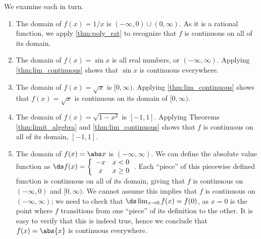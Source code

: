 {We examine each in turn.
\begin{enumerate}
	\item	The domain of $f(x) = 1/x$ is $(-\infty,0) \cup (0,\infty)$. As it is a rational function, we apply \autoref{thm:poly_rat} to recognize that $f$ is continuous on all of its domain.
	\item	The domain of $f(x) = \sin x$ is all real numbers, or $(-\infty,\infty)$. Applying \autoref{thm:lim_continuous} shows that $\sin x$ is continuous everywhere.
	\item	The domain of $f(x) = \sqrt{x}$ is $[0,\infty)$. Applying \autoref{thm:lim_continuous} shows that $f(x) = \sqrt{x}$ is continuous on its domain of $[0,\infty)$.
	\item	The domain of $f(x) = \sqrt{1-x^2}$ is $[-1,1]$. Applying Theorems \ref{thm:limit_algebra} and \ref{thm:lim_continuous} shows that $f$ is continuous on all of its domain, $[-1,1]$.
	\item	The domain of $f(x) = \abs x$ is $(-\infty,\infty)$. We can define the absolute value function as $\ds f(x) = \left\{\begin{array}{cc} -x & x<0 \\ x & x\geq 0\end{array}\right.$. Each ``piece'' of this piecewise defined function is continuous on all of its domain, giving that $f$ is continuous on $(-\infty,0)$ and $[0,\infty)$. We cannot assume this implies that $f$ is continuous on $(-\infty,\infty)$; we need to check that $\ds \lim_{x\to 0}f(x) = f(0)$, as $x=0$ is the point where $f$ transitions from one ``piece'' of its definition to the other. It is easy to verify that this is indeed true, hence we conclude that $f(x) = \abs{x}$ is continuous everywhere.\eoehere
\end{enumerate}}

